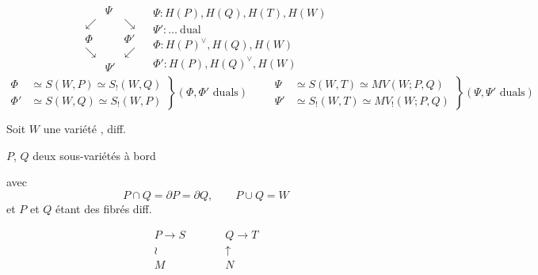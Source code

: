\documentclass[11pt,a4paper]{article}
\begin{document}
\[
  \boxed{\begin{array}{c|l}
    \begin{array}{ccc} & \Psi & \\ \swarrow & & \searrow \\ \Phi & & \Phi' \\ \searrow & & \swarrow \\ & \Psi' & \end{array}
    &
    \begin{array}{l}
      \Psi : H(P), H(Q), H(T), H(W) \\
      \Psi' : \ldots\ \text{dual} \\
      \Phi : H(P)^\vee, H(Q), H(W) \\
      \Phi' : H(P), H(Q)^\vee, H(W)
    \end{array}
  \end{array}}
\]
\[
  \left.\begin{aligned}
    \Phi &\simeq S(W, P) \simeq S_{!}(W, Q) \\
    \Phi' &\simeq S(W, Q) \simeq S_{!}(W, P)
  \end{aligned}\right\} (\Phi, \Phi' \text{ duals})
  \qquad
  \left.\begin{aligned}
    \Psi &\simeq S(W, T) \simeq MV(W; P, Q) \\
    \Psi' &\simeq S_{!}(W, T) \simeq MV_{!}(W; P, Q)
  \end{aligned}\right\} (\Psi, \Psi' \text{ duals})
\]


Soit $W$ une variété , diff.

$P$, $Q$ deux sous-variétés à bord

avec
\[
  P \cap Q = \partial P = \partial Q, \qquad P \cup Q = W
\]
et $P$ et $Q$ étant des fibrés diff.

\[
  \begin{array}{ccc}
    P \longrightarrow S & \qquad & Q \longrightarrow T \\
    \wr & & \uparrow \\
    M & & N
  \end{array}
\]
\end{document}
